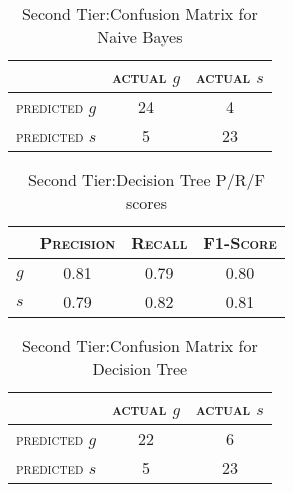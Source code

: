 \begin{table}[h]
	\center
	\begin{tabular}{ c | c  c }
		 & \textsc{actual $g$} & \textsc{actual $s$} \\
		\hline
		\textsc{predicted $g$} 	& 24 & 4 \\
		\textsc{predicted $s$}		& 5 & 23
	\end{tabular}
	\caption{Second Tier:Confusion Matrix for Naive Bayes}
\end{table}

\begin{table}[h]
	\center
	\begin{tabular}{ c | c  c  c }
		& \textsc{Precision} & \textsc{Recall} & \textsc{F1-Score} \\
		\hline
		\textsc{$g$} 	& 0.81 & 0.79 & 0.80 \\
		\textsc{$s$}	& 0.79 & 0.82 & 0.81
	\end{tabular}
	\caption{Second Tier:Decision Tree P/R/F scores}
\end{table}

\begin{table}[h]
	\center
	\begin{tabular}{ c | c  c }
		 & \textsc{actual $g$} & \textsc{actual $s$} \\
		\hline
		\textsc{predicted $g$} 	& 22 & 6 \\
		\textsc{predicted $s$}		& 5 & 23
	\end{tabular}
	\caption{Second Tier:Confusion Matrix for Decision Tree}
\end{table}